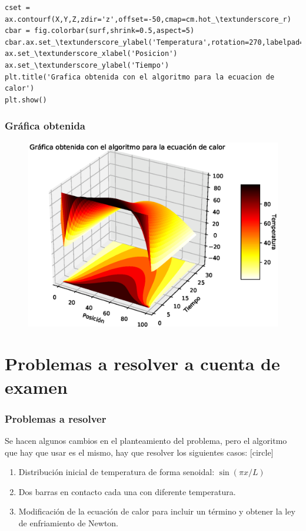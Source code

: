 {\begin{frame}
\begin{lstlisting}[caption=Rutina para graficar los resultados, style=FormattedNumber, basicstyle=\linespread{1.1}\ttfamily=\small, columns=fullflexible]
cset = ax.contourf(X,Y,Z,zdir='z',offset=-50,cmap=cm.hot_\textunderscore_r)
cbar = fig.colorbar(surf,shrink=0.5,aspect=5)
cbar.ax.set_\textunderscore_ylabel('Temperatura',rotation=270,labelpad=10)
ax.set_\textunderscore_xlabel('Posicion')
ax.set_\textunderscore_ylabel('Tiempo')
plt.title('Grafica obtenida con el algoritmo para la ecuacion de calor')
plt.show()
\end{lstlisting}
\end{frame}
\begin{frame}
\frametitle{Gráfica obtenida}
\begin{figure}
	\centering
	\includegraphics[scale=0.55]{Imagenes/SolucionEcuacionCalor_01.eps}  
\end{figure}
\end{frame}
}
\section{Problemas a resolver a cuenta de examen}
\begin{frame}
\frametitle{Problemas a resolver}
Se hacen algunos cambios en el planteamiento del problema, pero el algoritmo que hay que usar es el mismo, hay que resolver los siguientes casos:
[circle]
\begin{enumerate}[<+->]
\item Distribución inicial de temperatura de forma senoidal: $\sin( \pi x / L)$
\item Dos barras en contacto cada una con diferente temperatura.
\item Modificación de la ecuación de calor para incluir un término y obtener la ley de enfriamiento de Newton.
\end{enumerate}
\end{frame}
